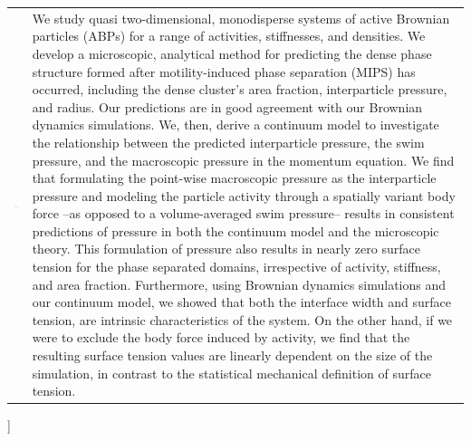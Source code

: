 \documentclass[twoside,twocolumn,9pt]{article}
\begin{document}
\begin{@twocolumnfalse}
\begin{tabular}{m{4.5cm} p{13.5cm} }
\includegraphics{dates} & \noindent\normalsize{We study quasi two-dimensional, monodisperse systems of active Brownian particles (ABPs) for a range of activities, stiffnesses, and densities. We develop a microscopic, analytical method for predicting the dense phase structure formed after motility-induced phase separation (MIPS) has occurred, including the dense cluster's area fraction, interparticle pressure, and radius. Our predictions are in good agreement with our Brownian dynamics simulations. We, then, derive a continuum model to investigate the relationship between the predicted interparticle pressure, the swim pressure, and the macroscopic pressure in the momentum equation. We find that formulating the point-wise macroscopic pressure as the interparticle pressure and modeling the particle activity through a spatially variant body force --as opposed to a volume-averaged swim pressure-- results in consistent predictions of pressure in both the continuum model and the microscopic theory. This formulation of pressure also results in nearly zero surface tension for the phase separated domains, irrespective of activity, stiffness, and area fraction. Furthermore, using Brownian dynamics simulations and our continuum model, we showed that both the interface width and surface tension, are intrinsic characteristics of the system. On the other hand, if we were to exclude the body force induced by activity, we find that the resulting surface tension values are linearly dependent on the size of the simulation, in contrast to the statistical mechanical definition of surface tension. 
}  \\

\end{tabular}

 \end{@twocolumnfalse} \vspace{0.6cm}

  ]

\renewcommand*\rmdefault{bch}\normalfont\upshape
\rmfamily
\section*{}
\vspace{-1cm}
\end{document}
